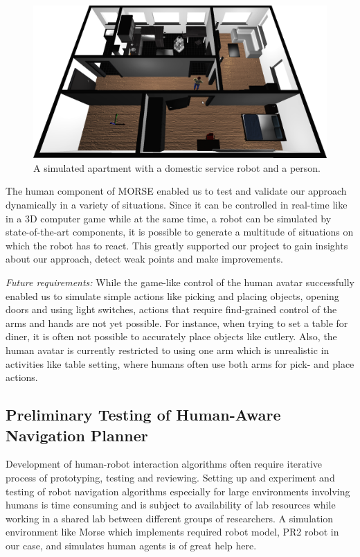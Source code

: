 \documentclass[conference]{IEEEtran}
\begin{document}
\begin{figure}[H]
      \centering
      \includegraphics[width=0.9\linewidth]{morse_apartment.png}
      \caption{A simulated apartment with a domestic service robot and a person.}
      \label{fig|apartment}
\end{figure}

The human component of MORSE enabled us to test and validate our approach
dynamically in a variety of situations. Since it can be controlled in real-time
like in a 3D computer game while at the same time, a robot can be simulated by
state-of-the-art components, it is possible to generate a multitude of
situations on which the robot has to react. This greatly supported our project
to gain insights about our approach, detect weak points and make improvements.

\emph{Future requirements:} While the game-like control of the human avatar 
successfully enabled us to simulate simple actions like picking and placing objects, 
opening doors and using light switches, actions that require find-grained control 
of the arms and hands are not yet possible. For instance, when trying to set a table for 
diner, it is often not possible to accurately place objects like cutlery. Also, the human
avatar is currently restricted to using one arm which is unrealistic in activities 
like table setting, where humans often use both arms for pick- and place actions.
 

\subsection{Preliminary Testing of Human-Aware Navigation Planner}
\label{sc:navigation}

Development of human-robot interaction algorithms often require iterative
process of prototyping, testing and reviewing. Setting up and experiment and
testing of robot navigation algorithms especially for large environments
involving humans is time consuming and is subject to availability of lab
resources while working in a shared lab between different groups of
researchers. A simulation environment like Morse which implements required robot
model, PR2 robot in our case, and simulates human agents is of great help here.
\end{document}
